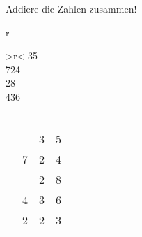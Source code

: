 \documentclass[a4paper,12pt]{article}
\begin{document}

Addiere die Zahlen zusammen!

\begin{center}
\large
r\begin{tabular}{>{\collectcell\stretchstring}{r}<{\endcollectcell}}
35\\
724\\
28\\
436\\ \hline
{}\\
\end{tabular}
\end{center}



\begin{center}
\begin{tabular}{cccc}
&&3&5\\
&7&2&4\\
&&2&8\\
&4&3&6\\ \hline
\antwortzeile 1&2&2&3\\
\end{tabular}
\end{center}

\end{document}
